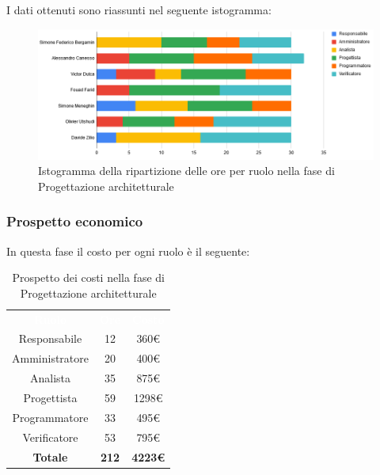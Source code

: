 I dati ottenuti sono riassunti nel seguente istogramma:
\begin{figure}[H]
\centering
\includegraphics[scale=0.60]{img/grafici/tabella_fase_prog_architetturale.png}
\caption{Istogramma della ripartizione delle ore per ruolo nella fase di Progettazione architetturale}
\end{figure}
 
\subsubsection{Prospetto economico}
In questa fase il costo per ogni ruolo è il seguente:
 
\begin{table}[H]
\centering\renewcommand{\arraystretch}{1.5}
\caption{Prospetto dei costi nella fase di Progettazione architetturale}
\vspace{0.2cm}
\begin{tabular}{ c c c }
\rowcolor{redafk}
\textcolor{white}{\textbf{Ruolo}} & \textcolor{white}{\textbf{Ore}} &
\textcolor{white}{\textbf{Costo}}  \\
Responsabile & 12 & 360€ \\
Amministratore & 20 & 400€ \\
Analista & 35 & 875€ \\
Progettista & 59 & 1298€ \\
Programmatore & 33 & 495€  \\
Verificatore & 53 & 795€  \\
\rowcolor{lastrowcolor}
\textbf{Totale} & \textbf{212} & \textbf{4223€}  \\
\end{tabular}
\end{table}
 
